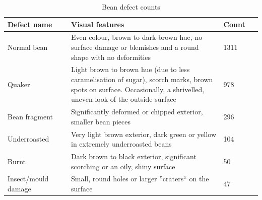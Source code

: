 \begin{table}[h]
	\centering
	\begin{tabular}{|p{0.25\linewidth}|p{0.6\linewidth}|p{0.15\linewidth}|}
		\toprule \textbf{Defect name} & \textbf{Visual features}                                                                                                                                             & \textbf{Count} \\
		\midrule Normal bean          & Even colour, brown to dark-brown hue, no surface damage or blemishes and a round shape with no deformities                                                           & 1311           \\
		Quaker                        & Light brown to brown hue (due to less caramelisation of sugar), scorch marks, brown spots on surface.
		Occasionally, a shrivelled, uneven look of the outside surface & 978            \\
		Bean fragment                 & Significantly deformed or chipped exterior, smaller bean pieces                                                                                                      & 296            \\
		Underroasted                  & Very light brown exterior, dark green or yellow in extremely underroasted beans                                                                                      & 104            \\
		Burnt                         & Dark brown to black exterior, significant scorching or an oily, shiny surface                                                                                        & 50             \\
		Insect/mould damage           & Small, round holes or larger ''craters`` on the surface                                                                                                              & 47             \\
		\bottomrule
	\end{tabular}
	\caption{Bean defect counts}
	\label{tab:beanDefectCounts}
\end{table}

